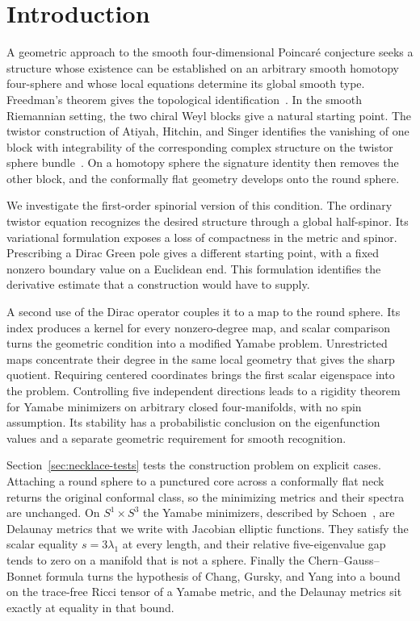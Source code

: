 \documentclass[11pt]{article}
\numberwithin{equation}{section}
\begin{document}
\section{Introduction}\label{sec:intro}

A geometric approach to the smooth four-dimensional Poincar\'e conjecture
seeks a structure whose existence can be established on an arbitrary
smooth homotopy four-sphere and whose local equations determine its
global smooth type. Freedman's theorem gives the topological
identification~\cite{Freedman1982}. In the smooth Riemannian setting,
the two chiral Weyl blocks give a natural starting point. The twistor
construction of Atiyah, Hitchin, and Singer identifies the vanishing of
one block with integrability of the corresponding complex structure on
the twistor sphere bundle~\cite[Theorem~4.1]{AHS1978}. On a homotopy
sphere the signature identity then removes the other block, and the
conformally flat geometry develops onto the round sphere.

We investigate the first-order spinorial version of this condition.
The ordinary twistor equation recognizes the desired structure through
a global half-spinor. Its variational formulation exposes a loss of
compactness in the metric and spinor. Prescribing a Dirac Green pole
gives a different starting point, with a fixed nonzero boundary value
on a Euclidean end. This formulation identifies the derivative estimate
that a construction would have to supply.

A second use of the Dirac operator couples it to a map to the round
sphere. Its index produces a kernel for every nonzero-degree map, and
scalar comparison turns the geometric condition into a modified
Yamabe problem. Unrestricted maps concentrate their degree in the
same local geometry that gives the sharp quotient. Requiring centered
coordinates brings the first scalar eigenspace into the problem.
Controlling five independent directions leads to a rigidity theorem
for Yamabe minimizers on arbitrary closed four-manifolds, with no spin
assumption. Its stability has a probabilistic conclusion on the
eigenfunction values and a separate geometric requirement for smooth
recognition.

Section~\ref{sec:necklace-tests} tests the construction problem on explicit
cases. Attaching a round sphere to a punctured core across a
conformally flat neck returns the original conformal class, so the
minimizing metrics and their spectra are unchanged. On
\(S^1\times S^3\) the Yamabe minimizers, described by
Schoen~\cite[\S2]{Schoen1989Variational}, are Delaunay metrics that we
write with Jacobian elliptic functions. They satisfy the scalar
equality \(s=3\lambda_1\) at every length, and their relative
five-eigenvalue gap tends to zero on a manifold that is not a sphere.
Finally the Chern--Gauss--Bonnet formula turns the hypothesis of
Chang, Gursky, and Yang into a bound on the trace-free Ricci tensor of
a Yamabe metric, and the Delaunay metrics sit exactly at equality in
that bound.
\end{document}
